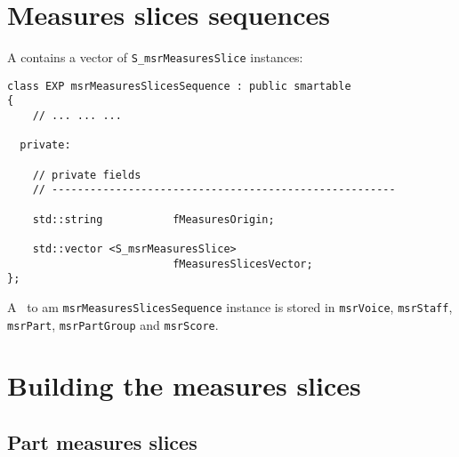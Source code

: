 \section{Measures slices sequences}

A  contains a vector of {\tt S_msrMeasuresSlice} instances:
\begin{lstlisting}[language=CPlusPlus]
class EXP msrMeasuresSlicesSequence : public smartable
{
	// ... ... ...

  private:

    // private fields
    // ------------------------------------------------------

    std::string           fMeasuresOrigin;

    std::vector <S_msrMeasuresSlice>
                          fMeasuresSlicesVector;
};
\end{lstlisting}

A \smart\ to am {\tt msrMeasuresSlicesSequence} instance is stored in {\tt msrVoice}, {\tt msrStaff}, {\tt msrPart}, {\tt msrPartGroup} and {\tt msrScore}.


\section{Building the measures slices}

\subsection{Part measures slices}

